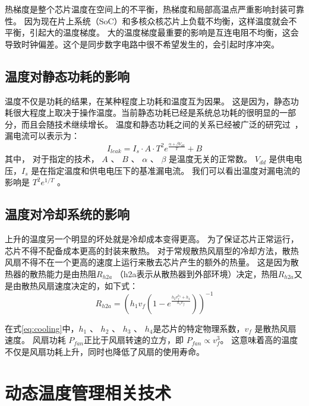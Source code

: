 热梯度是整个芯片温度在空间上的不平衡，热梯度和局部高温点严重影响封装可靠性。
因为现在片上系统（SoC）和多核众核芯片上负载不均衡，这样温度就会不平衡，引起大的温度梯度。
大的温度梯度最重要的影响是互连电阻不均衡，这会导致时钟偏差。这个是同步数字电路中很不希望发生的，会引起时序冲突。

\subsection{温度对静态功耗的影响}\label{sec:leakage}

温度不仅是功耗的结果，在某种程度上功耗和温度互为因果。
这是因为，静态功耗很大程度上取决于操作温度。当前静态功耗已经是系统总功耗的很明显的一部分，而且会随技术继续增长。
温度和静态功耗之间的关系已经被广泛的研究过~，漏电流可以表示为：
\begin{equation}
I_{leak} = I_s \cdot A \cdot T^2e^{\frac{\alpha + \beta V_{dd}}{T}}+B
\end{equation}
其中， 对于指定的技术， $A$ 、 $B$ 、  $\alpha$ 、 $\beta$ 是温度无关的正常数。
$V_{dd}$ 是供电电压，$I_s$ 是在指定温度和供电电压下的基准漏电流。
我们可以看出温度对漏电流的影响是 $T^2e^{1/T}$ 。

\subsection{温度对冷却系统的影响}\label{sec:cooling}

上升的温度另一个明显的坏处就是冷却成本变得更高。
为了保证芯片正常运行，芯片不得不配备成本更高的封装来散热。
对于常规散热风扇型的冷却方法，散热风扇不得不在一个更高的速度上运行来散去芯片产生的额外的热量。
这是因为散热器的散热能力是由热阻$R_{h2a}$ （h2a表示从散热器到外部环境）决定，热阻$R_{h2a}$又是由散热风扇速度决定的，如下式：
\begin{equation}\label{eq:cooling}
R_{h2a} = (h_1v_f(1-e^{\frac{h_2v_f^{h_3}+h_4}{h_1v_f}}))^{-1}
\end{equation}

在式\eqref{eq:cooling}中，$h_1$ 、 $h_2$ 、 $h_3$ 、 $h_4$是芯片的特定物理系数，$v_f$ 是散热风扇速度。
风扇功耗 $P_{fan}$正比于风扇转速的立方，即 $P_{fan} \propto v_f^3$。
这意味着高的温度不仅是风扇功耗上升，同时也降低了风扇的使用寿命。

\section{动态温度管理相关技术}\label{sec:DTM}

